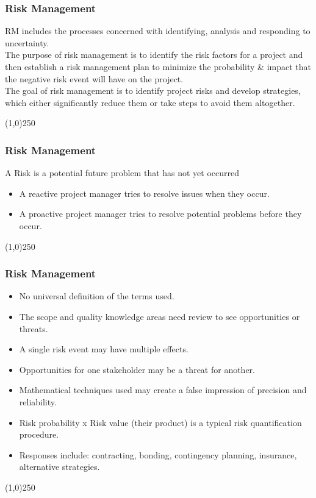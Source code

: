 \begin{frame}
\frametitle{Risk Management}

RM includes the processes concerned with identifying, analysis and responding to uncertainty.\\
The purpose of risk management is to identify the risk factors for a project and then establish a risk management plan to minimize the probability \& impact that the negative risk event will have on the project. \\
The goal of risk management is to identify project risks and develop strategies, which either significantly reduce them or take steps to avoid them altogether.\\

\end{frame}\begin{center}\line(1,0){250}\end{center}






\begin{frame}
\frametitle{Risk Management}
A Risk is a potential future problem that has not yet occurred 
\begin{itemize}
	\item A reactive project manager tries to resolve issues when they occur. 
\item A proactive project manager tries to resolve potential problems before they occur. 
\end{itemize}
\end{frame}\begin{center}\line(1,0){250}\end{center}





\begin{frame}
\frametitle{Risk Management}
\begin{itemize}
\item No universal definition of the terms used. 
\item The scope and quality knowledge areas need review to see opportunities or threats. 
\item A single risk event may have multiple effects. 
\item Opportunities for one stakeholder may be a threat for another. 
\item Mathematical techniques used may create a false impression of precision and reliability.
\item Risk probability x Risk value (their product) is a typical risk quantification procedure. 
\item Responses include: contracting, bonding, contingency planning, insurance, alternative strategies. 
\end{itemize}
\end{frame}\begin{center}\line(1,0){250}\end{center}





